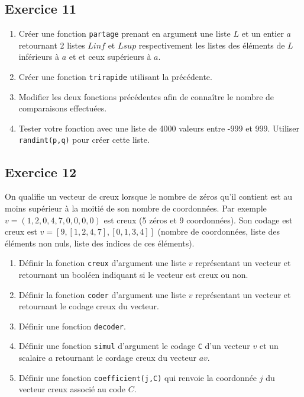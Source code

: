 \documentclass[10pt,fleqn]{article} %
\begin{document}
\begin{multicols}{2}
\subsection*{Exercice 11}
\begin{enumerate}
\item Créer une fonction \texttt{partage} prenant en argument une liste $L$ et un entier $a$ retournant 2 listes $Linf$ et $Lsup$ respectivement les listes des éléments de $L$ inférieurs à $a$ et et ceux supérieurs à $a$.
\item Créer une fonction \texttt{trirapide} utilisant la précédente. 
\item Modifier les deux fonctions précédentes afin de connaître le nombre de comparaisons effectuées. 
\item Tester votre fonction avec une liste de 4000 valeurs entre -999 et 999. Utiliser \texttt{randint(p,q)} pour créer cette liste.
\end{enumerate}

\subsection*{Exercice 12}
On qualifie un vecteur de creux lorsque le nombre de zéros qu'il contient est au moins supérieur à la moitié de son nombre de coordonnées. Par exemple $v=\left(1,2,0,4,7,0,0,0,0\right)$ est creux (5 zéros et 9 coordonnées). Son codage est creux est $v=\left[9,[1,2,4,7],[0,1,3,4]\right]$ (nombre de coordonnées, liste des éléments non nuls, liste des indices de ces éléments).
\begin{enumerate}
\item Définir la fonction \texttt{creux} d'argument une liste $v$ représentant un vecteur et retournant un booléen indiquant si le vecteur est creux ou non.
\item Définir la fonction \texttt{coder} d'argument une liste $v$ représentant un vecteur et retournant le codage creux du vecteur.
\item Définir une fonction \texttt{decoder}.
\item Définir une fonction \texttt{simul} d'argument le codage \texttt{C} d'un vecteur $v$ et un scalaire $a$ retournant le cordage creux du vecteur $av$.
\item Définir une fonction \texttt{coefficient(j,C)} qui renvoie la coordonnée $j$ du vecteur creux associé au code $C$.
\end{enumerate}


\end{multicols}
\end{document}
